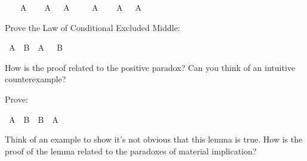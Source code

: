 \begin{isabellebody}
\ \ \isamarkupfalse%
\ {\isachardoublequoteopen}A{\isachardoublequoteclose}\isanewline
\ \ \isamarkupfalse%
\ {\isachardoublequoteopen}A\ {\isasymor}\ {\isasymnot}\ A{\isachardoublequoteclose}\isacommand{{\isachardot}{\isachardot}}\isamarkupfalse%
\isanewline
{}\isamarkupfalse%
\isanewline
\ \ \isamarkupfalse%
\ {\isachardoublequoteopen}{\isasymnot}\ A{\isachardoublequoteclose}\isanewline
\ \ \isamarkupfalse%
\ {\isachardoublequoteopen}A\ {\isasymor}\ {\isasymnot}\ A{\isachardoublequoteclose}\isacommand{{\isachardot}{\isachardot}}\isamarkupfalse%
\isanewline
{}\isamarkupfalse%
%
\endisatagproof
{\isafoldproof}%
%
\isadelimproof
%
\endisadelimproof
%
\begin{isamarkuptext}%
\begin{Exercise}[title = Conditional Excluded Middle] Prove the Law of Conditional Excluded
Middle: \end{Exercise}%
\end{isamarkuptext}\isamarkuptrue%
\isamarkupfalse%
\ {\isachardoublequoteopen}{\isacharparenleft}A\ {\isasymlongrightarrow}\ B{\isacharparenright}\ {\isasymor}\ {\isacharparenleft}A\ {\isasymlongrightarrow}\ {\isasymnot}\ B{\isacharparenright}{\isachardoublequoteclose}%
\isadelimproof
\ %
\endisadelimproof
%
\isatagproof
{}\isamarkupfalse%
%
\endisatagproof
{\isafoldproof}%
%
\isadelimproof
%
\endisadelimproof
%
\begin{isamarkuptext}%
How is the proof related to the positive paradox? Can you think of an intuitive counterexample?%
\end{isamarkuptext}\isamarkuptrue%
%
\begin{isamarkuptext}%
\begin{Exercise} Prove: \end{Exercise}%
\end{isamarkuptext}\isamarkuptrue%
\isamarkupfalse%
\ {\isachardoublequoteopen}{\isacharparenleft}A\ {\isasymlongrightarrow}\ B{\isacharparenright}\ {\isasymor}\ {\isacharparenleft}B\ {\isasymlongrightarrow}\ A{\isacharparenright}{\isachardoublequoteclose}%
\isadelimproof
\ %
\endisadelimproof
%
\isatagproof
{}\isamarkupfalse%
%
\endisatagproof
{\isafoldproof}%
%
\isadelimproof
%
\endisadelimproof
%
\begin{isamarkuptext}%
Think of an example to show it's not obvious that this lemma is true. How is the proof of
the lemma related to the paradoxes of material implication?%

\end{isamarkuptext}
\end{isabellebody}
